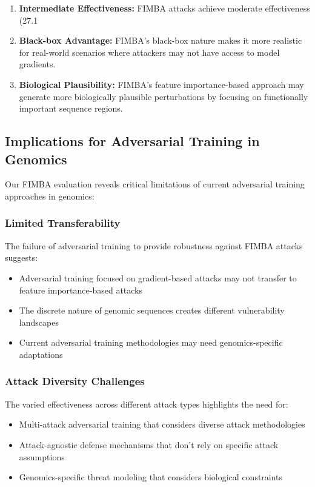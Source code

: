 \documentclass{article} %
\begin{document}
\begin{enumerate}
    \item \textbf{Intermediate Effectiveness:} FIMBA attacks achieve moderate effectiveness (27.1%
    
    \item \textbf{Black-box Advantage:} FIMBA's black-box nature makes it more realistic for real-world scenarios where attackers may not have access to model gradients.
    
    \item \textbf{Biological Plausibility:} FIMBA's feature importance-based approach may generate more biologically plausible perturbations by focusing on functionally important sequence regions.
\end{enumerate}

\subsection{Implications for Adversarial Training in Genomics}

Our FIMBA evaluation reveals critical limitations of current adversarial training approaches in genomics:

\subsubsection{Limited Transferability}

The failure of adversarial training to provide robustness against FIMBA attacks suggests:
\begin{itemize}
    \item Adversarial training focused on gradient-based attacks may not transfer to feature importance-based attacks
    \item The discrete nature of genomic sequences creates different vulnerability landscapes
    \item Current adversarial training methodologies may need genomics-specific adaptations
\end{itemize}

\subsubsection{Attack Diversity Challenges}

The varied effectiveness across different attack types highlights the need for:
\begin{itemize}
    \item Multi-attack adversarial training that considers diverse attack methodologies
    \item Attack-agnostic defense mechanisms that don't rely on specific attack assumptions
    \item Genomics-specific threat modeling that considers biological constraints
\end{itemize}
\end{document}
